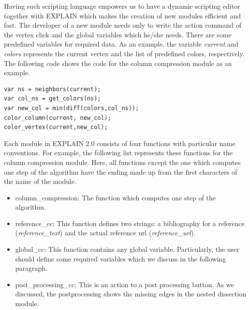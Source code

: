 \documentclass[12pt, twoside,a4paper,toc=bibliography]{scrbook}
\begin{document}
Having such scripting language empowers us to have a dynamic scripting editor
together with EXPLAIN which makes the creation of new modules efficient and fast.
The developer of a new module needs only to write the action command of the vertex
click and the global variables which he/she needs.
There are some predefined variables for required data.
As an example, the variable \textit{current} and \textit{colors}
represents the current vertex and the list of predefined colors, respectively.
The following code shows the code for the column compression
module as an example.
\begin{lstlisting}
var ns = neighbors(current);
var col_ns = get_colors(ns);
var new_col = min(diff(colors,col_ns));
color_column(current, new_col);
color_vertex(current,new_col);
\end{lstlisting}
Each module in EXPLAIN 2.0 consists of four functions with particular
name conventions. For example, the following list represents these functions
for the column compression module.
Here, all functions except the one which computes one step of the algorithm
have the ending made up from the first characters of the name of the module.
\begin{itemize}
\item column\_compression: The function which computes one step of the algorithm.
\item reference\_cc: This function defines two strings: a bibliography for a reference (\textit{reference\_text}) and the actual reference url (\textit{reference\_url}).
\item global\_cc: This function contains any global variable. Particularly, the user should define some required variables which we discuss in the following paragraph.
\item post\_processing\_cc: This is an action to a post processing button. As we discussed, the postprocessing shows the missing edges in the nested dissection module.
\end{itemize}
\end{document}
